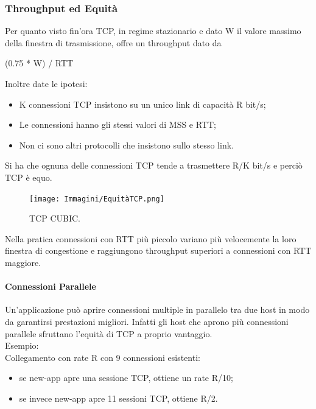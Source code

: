 \subsubsection{Throughput ed Equità}
Per quanto visto fin'ora TCP, in regime stazionario e dato W il valore massimo della finestra di trasmissione, offre un throughput dato da 
\begin{center}
    (0.75 * W) / RTT
\end{center}
Inoltre date le ipotesi:
\begin{itemize}
    \item K connessioni TCP insistono su un unico link di capacità R bit/s;
    \item Le connessioni hanno gli stessi valori di MSS e RTT;
    \item Non ci sono altri protocolli che insistono sullo stesso link.
\end{itemize}
Si ha che ognuna delle connessioni TCP tende a trasmettere R/K bit/s e perciò TCP è equo.
\begin{figure}[h]
    \centering
    \texttt{[image: Immagini/EquitàTCP.png]}
    \caption{TCP CUBIC.}
\end{figure}

Nella pratica connessioni con RTT più piccolo variano più velocemente la loro finestra di congestione e raggiungono throughput superiori a connessioni con RTT maggiore.

\paragraph{Connessioni Parallele}
Un’applicazione può aprire connessioni multiple in parallelo tra due host in modo da garantirsi prestazioni migliori. Infatti gli host che aprono più connessioni parallele sfruttano l'equità di TCP a proprio vantaggio.
\\Esempio:
\\Collegamento con rate R con 9 connessioni esistenti:
\begin{itemize}
    \item se new-app apre una sessione TCP, ottiene un rate R/10;
    \item se invece new-app apre 11 sessioni TCP, ottiene R/2.
\end{itemize}